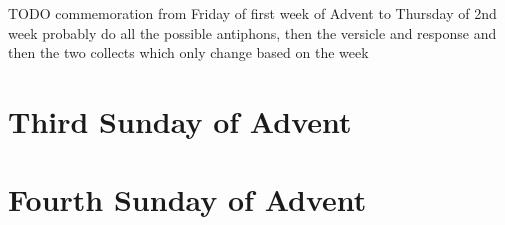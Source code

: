 {{{{	{
		\def\vrlinebreak{T}
		\printvr[\greblockcustos]{\vrtex}{\vtranslation}{\rtranslation}
	}
	}
}
}

{
\bigskip

\bigskip
\noindent
{}
\bigskip
TODO commemoration from Friday of first week of Advent to Thursday of 2nd week
probably do all the possible antiphons, then the versicle and response and then the two collects which only change based on the week
}


{
\def\vrlinebreak{T}

\bigskip
\benedicamusdomino{}
}



{
\section{Third Sunday of Advent}
\subtitle{1st Class}

\def\prepsalmfive{\greblockcustos}
\def\preantfour{\needspace{15\baselineskip}}
\def\premag{\def\noeuouae{T}
\printnote{When the third Sunday of Advent falls on December 17, the Antiphon \emph{O Sapiéntia} on page \pageref{osapientia} is sung in place of \emph{Beáta es}.}
\medskip

\label{magant-beataes}
}
\def\premagverses{\greblockcustos}
\def\postmag{
	\def\nomagtitle{T}
	\def\magsolemn{T}
	\def\gabcfolder{../Advent}
	\def\noeuouae{T}
	\renewcommand{\anttranslation}{O Wisdom, which camest out of the mouth of the Most High, reaching from end to end and ordering all things mightily and sweetly: come and teach us the way of prudence.}
	\label{osapientia}
	\def\preverses{\greblockcustos}
	\printmag{2D}{O}{December17-MagAntiphon}
}
\bigskip
\benedicamusdomino{}
}



{
\section{Fourth Sunday of Advent}
\subtitle{1st Class}

}}
